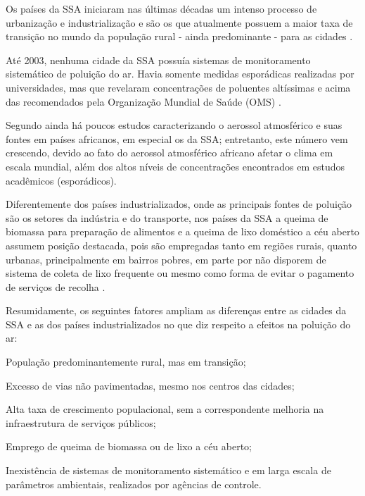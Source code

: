Os países da SSA iniciaram nas últimas décadas um intenso processo de urbanização e
industrialização e são os que atualmente possuem a maior taxa de transição no 
mundo da população rural - ainda predominante - para as cidades 
\citep{MONTGOMERY2008}. 
 
Até 2003, nenhuma cidade da SSA possuía sistemas de monitoramento 
sistemático de poluição do ar. Havia somente medidas esporádicas realizadas
por universidades, mas que revelaram concentrações de poluentes altíssimas e 
acima das recomendados pela Organização Mundial de Saúde (OMS) 
\citep{EZZATI2004}.

Segundo \citet{aboh2009} ainda há poucos estudos caracterizando o 
aerossol atmosférico e suas fontes em países africanos, em especial os da SSA; 
entretanto, este número vem crescendo, devido ao fato do aerossol atmosférico 
africano afetar o clima em escala mundial, além dos altos níveis de 
concentrações encontrados em estudos acadêmicos (esporádicos).

Diferentemente dos países industrializados, onde as principais fontes de 
poluição são os setores da indústria e do transporte, nos países da SSA a 
queima de biomassa para preparação de alimentos e a queima de lixo 
doméstico a céu aberto assumem posição destacada, pois são empregadas tanto em 
regiões rurais, quanto urbanas, principalmente em bairros pobres, 
em parte por não disporem de sistema de coleta de lixo frequente ou 
mesmo como forma de evitar o pagamento de serviços de recolha \citep{SMITH2004}.

Resumidamente, os seguintes fatores ampliam as diferenças entre as cidades da 
SSA e as dos países industrializados no que diz respeito a efeitos na 
poluição do ar:
 
\begin{itemize}
\begin{spacing}{1.0}
  \item População predominantemente rural, mas em transição;
  \item Excesso de vias não pavimentadas, mesmo nos centros das cidades;
  \item Alta taxa de crescimento populacional, sem a correspondente melhoria 
        na infraestrutura de serviços públicos;
  \item Emprego de queima de biomassa ou de lixo a céu aberto;
  \item Inexistência de sistemas de monitoramento sistemático e em larga escala
        de parâmetros ambientais, realizados por agências de controle.
\end{spacing}
\end{itemize}

